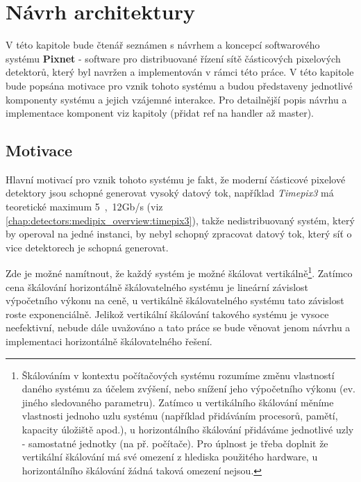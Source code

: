 

\chapter{Návrh architektury}\label{chap:arch}
V této kapitole bude čtenář seznámen s návrhem a koncepcí softwarového systému \textbf{Pixnet} - software pro distribuované řízení sítě částicových pixelových detektorů, který byl navržen a implementován v rámci této práce. V této kapitole bude popsána motivace pro vznik tohoto systému a budou představeny jednotlivé komponenty systému a jejich vzájemné interakce. Pro detailnější popis návrhu a implementace komponent viz kapitoly \todo (přidat ref na handler až master).

\section{Motivace}\label{chap:arch:motivation}
Hlavní motivací pro vznik tohoto systému je fakt, že moderní částicové pixelové detektory jsou schopné generovat vysoký datový tok, například \textit{Timepix3} má teoretické maximum \unit{5,12}{Gb/s} (viz \ref{chap:detectors:medipix_overview:timepix3}), takže nedistribuovaný systém, který by operoval na jedné instanci, by nebyl schopný zpracovat datový tok, který síť o vice detektorech je schopná generovat. 

Zde je možné namítnout, že každý systém je možné škálovat vertikálně\footnote{Škálováním v kontextu počítačových systému rozumíme změnu vlastností daného systému za účelem zvýšení, nebo snížení jeho výpočetního výkonu (ev. jiného sledovaného parametru). Zatímco u vertikálního škálování měníme vlastnosti jednoho uzlu systému (například přidáváním procesorů, pamětí, kapacity úložiště apod.), u horizontálního škálování přidáváme jednotlivé uzly - samostatné  jednotky (na př. počítače). Pro úplnost je třeba doplnit že vertikální škálování má své omezení z hlediska použitého hardware, u horizontálního škálování žádná taková omezení nejsou.}. Zatímco cena škálování horizontálně škálovatelného systému je lineární závislost výpočetního výkonu na ceně, u vertikálně škálovatelného systému tato závislost roste exponenciálně. Jelikož vertikální škálování takového systému je  vysoce neefektivní, nebude dále uvažováno a tato práce se bude věnovat jenom návrhu a implementaci horizontálně škálovatelného řešení.

